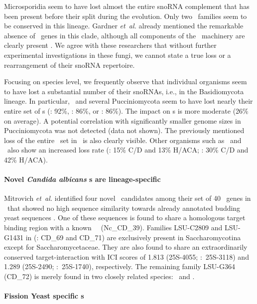 Microsporidia seem to have lost almost the entire snoRNA complement that
has been present before their split during the evolution.  Only two \cd\
families seem to be conserved in this lineage.  Gardner \emph{et~al.}
already mentioned the remarkable absence of \sno\ genes in this clade,
although all components of the \sno\ machinery are clearly present
\cite{Gardner:2010}.  We agree with these researchers that without further
experimental investigations in these fungi, we cannot state a true loss or
a rearrangement of their snoRNA repertoire.

Focusing on species level, we frequently observe that individual organisms
seem to have lost a substantial number of their snoRNAs, i.e., in the
Basidiomycota lineage.  In particular, \wse\ and several Pucciniomycota
seem to have lost nearly their entire set of \haca s (\wse: 92\%, \rmi:
86\%, or \sli: 86\%). The impact on \cd s is more moderate (26\% on
average). A potential correlation with significantly smaller genome sizes
in Pucciniomycota was not detected (data not shown). The previously
mentioned loss of the entire \haca\ set in \Ptt\ is also clearly
visible. Other organisms such as \pan\ and \opi\ also show an increased
loss rate (\pan: 15\% C/D and 13\% H/ACA; \opi: 30\% C/D and 42\% H/ACA).

\paragraph{\textbf{Novel \emph{Candida albicans} \sno s are lineage-specific}}

Mitrovich \emph{et~al.} identified four novel \sno\ candidates among their
set of 40 \sno\ genes in \calb\ that showed no high sequence similarity
towards already annotated budding yeast sequences
\cite{Mitrovich:2010}. One of these sequences is found to share a
homologous target binding region with a known \ncr\ \sno\
(Nc\_CD\_39). Families LSU-C2809 and LSU-G1431 in \cite{Mitrovich:2010}
(\snostrip: CD\_69 and CD\_71) are exclusively present in Saccharomycotina
except for Saccharomycetaceae. They are also found to share an
extraordinarily conserved target-interaction with ICI scores of 1.813
(25S-4055; \calb:~25S-3118) and 1.289 (25S-2490; \calb:~25S-1740),
respectively. The remaining family LSU-G364 (CD\_72) is merely found in two
closely related species: \cdu\ and \ctr.

\paragraph{\textbf{Fission Yeast specific \sno s}}

